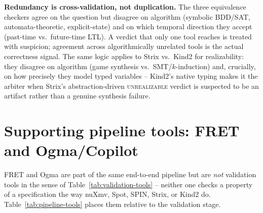 \documentclass[11pt]{article}
\begin{document}
\textbf{Redundancy is cross-validation, not duplication.} The three equivalence checkers agree
on the question but disagree on algorithm (symbolic BDD/SAT, automata-theoretic, explicit-state)
and on which temporal direction they accept (past-time vs.\ future-time LTL). A verdict that
only one tool reaches is treated with suspicion; agreement across algorithmically unrelated
tools is the actual correctness signal. The same logic applies to Strix vs.\ Kind2 for
realizability: they disagree on algorithm (game synthesis vs.\ SMT/$k$-induction) and, crucially,
on how precisely they model typed variables -- Kind2's native typing makes it the arbiter when
Strix's abstraction-driven \textsc{unrealizable} verdict is suspected to be an artifact rather
than a genuine synthesis failure.

\section{Supporting pipeline tools: FRET and Ogma/Copilot}

FRET and Ogma are part of the same end-to-end pipeline but are \emph{not} validation tools in
the sense of Table~\ref{tab:validation-tools} -- neither one checks a property of a
specification the way nuXmv, Spot, SPIN, Strix, or Kind2 do. Table~\ref{tab:pipeline-tools}
places them relative to the validation stage.
\end{document}
